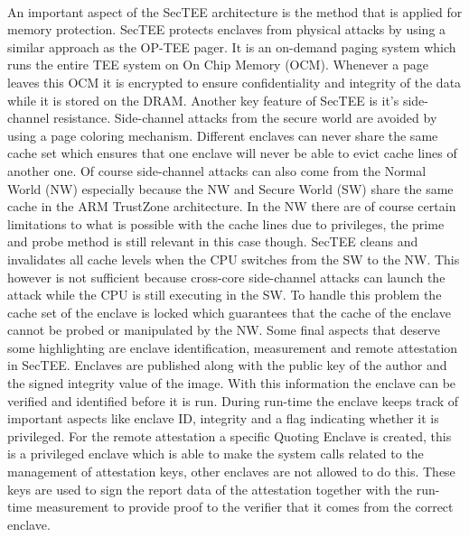 \paragraph*{}
An important aspect of the SecTEE architecture is the method that is applied for memory protection. SecTEE protects enclaves from physical attacks by using a similar approach as the OP-TEE pager. It is an on-demand paging system which runs the entire TEE system on On Chip Memory (OCM). Whenever a page leaves this OCM it is encrypted to ensure confidentiality and integrity of the data while it is stored on the DRAM. Another key feature of SecTEE is it's side-channel resistance. Side-channel attacks from the secure world are avoided by using a page coloring mechanism. Different enclaves can never share the same cache set which ensures that one enclave will never be able to evict cache lines of another one. Of course side-channel attacks can also come from the Normal World (NW) especially because the NW and Secure World (SW) share the same cache in the ARM TrustZone architecture. In the NW there are of course certain limitations to what is possible with the cache lines due to privileges, the prime and probe method is still relevant in this case though. SecTEE cleans and invalidates all cache levels when the CPU switches from the SW to the NW. This however is not sufficient because cross-core side-channel attacks can launch the attack while the CPU is still executing in the SW. To handle this problem the cache set of the enclave is locked which guarantees that the cache of the enclave cannot be probed or manipulated by the NW. Some final aspects that deserve some highlighting are enclave identification, measurement and remote attestation in SecTEE. Enclaves are published along with the public key of the author and the signed integrity value of the image. With this information the enclave can be verified and identified before it is run. During run-time the enclave keeps track of important aspects like enclave ID, integrity and a flag indicating whether it is privileged. For the remote attestation a specific Quoting Enclave is created, this is a privileged enclave which is able to make the system calls related to the management of attestation keys, other enclaves are not allowed to do this. These keys are used to sign the report data of the attestation together with the run-time measurement to provide proof to the verifier that it comes from the correct enclave.

